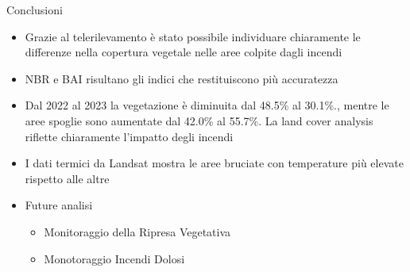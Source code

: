 \documentclass{beamer}
\begin{document}



\begin{frame}{Conclusioni}
    \centering
    \small
    \begin{itemize}
    \item  Grazie al telerilevamento è stato possibile individuare chiaramente le differenze nella copertura vegetale nelle aree colpite dagli incendi
            \vspace{0.2cm}
    \item NBR e BAI risultano gli indici che restituiscono più accuratezza
                \vspace{0.2cm}
    \item Dal 2022 al 2023 la vegetazione è diminuita dal 48.5\% al 30.1\%., mentre le aree spoglie sono aumentate dal 42.0\% al 55.7\%. La land cover analysis riflette chiaramente l'impatto degli incendi
                \vspace{0.2cm}
    \item I dati termici da Landsat mostra le aree bruciate con temperature più elevate rispetto alle altre
                \vspace{0.2cm}
    \item Future analisi 
    \begin{itemize}
        \item Monitoraggio della Ripresa Vegetativa
         \item Monotoraggio Incendi Dolosi
    \end{itemize}
    \end{itemize}
\end{frame}
\end{document}
